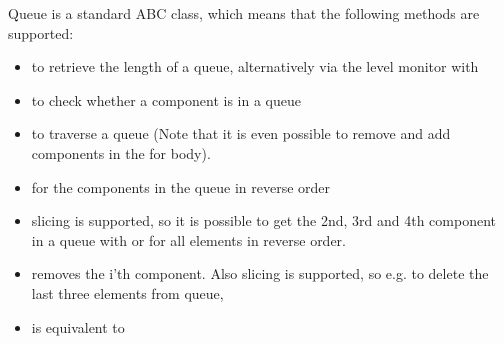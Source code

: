 \documentclass[letterpaper,10pt,english]{sphinxmanual}
\begin{document}
Queue is a standard ABC class, which means that the following methods are supported:
\begin{itemize}
\item {} 
 to retrieve the length of a queue, alternatively via the level monitor with 

\item {} 
 to check whether a component is in a queue

\item {} 
 to traverse a queue (Note that it is even possible to remove and add components in the for body).

\item {} 
 for the components in the queue in reverse order

\item {} 
slicing is supported, so it is possible to get the 2nd, 3rd and 4th component in a queue with  or 
for all elements in reverse order.

\item {} 
 removes the i’th component. Also slicing is supported, so e.g. to delete the last three elements from queue,

\item {} 
 is equivalent to 

\end{itemize}
\end{document}
